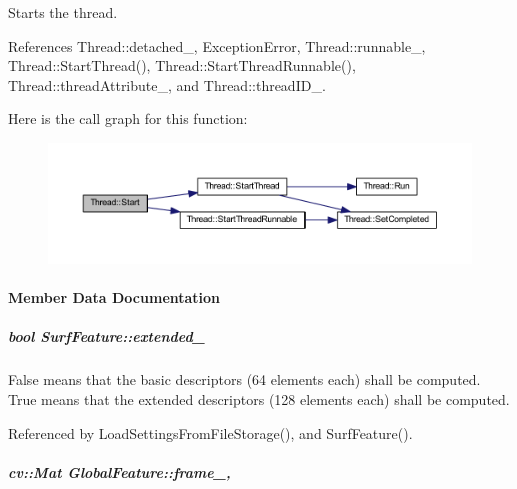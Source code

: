 Starts the thread. 



References Thread\-::detached\-\_\-, Exception\-Error, Thread\-::runnable\-\_\-, Thread\-::\-Start\-Thread(), Thread\-::\-Start\-Thread\-Runnable(), Thread\-::thread\-Attribute\-\_\-, and Thread\-::thread\-I\-D\-\_\-.



Here is the call graph for this function\-:
\nopagebreak
\begin{figure}[H]
\begin{center}
\leavevmode
\includegraphics[width=350pt]{group___core_a2b42f82341afd2747ea093b6ac8b91cb_cgraph}
\end{center}
\end{figure}




\paragraph{Member Data Documentation}
\hypertarget{group___feature_extractor_a89c68527db49e286206062375b09c7bd}{
\subparagraph[{extended\-\_\-}]{\setlength{\rightskip}{0pt plus 5cm}bool Surf\-Feature\-::extended\-\_\-\hspace{0.3cm}{\ttfamily [private]}}}\label{group___feature_extractor_a89c68527db49e286206062375b09c7bd}


False means that the basic descriptors (64 elements each) shall be computed. True means that the extended descriptors (128 elements each) shall be computed. 



Referenced by Load\-Settings\-From\-File\-Storage(), and Surf\-Feature().

\hypertarget{group___feature_extractor_aae4295da2c3999edcb99b46d70ee7166}{
\subparagraph[{frame\-\_\-}]{\setlength{\rightskip}{0pt plus 5cm}cv\-::\-Mat Global\-Feature\-::frame\-\_\-\hspace{0.3cm}{\ttfamily [protected]}, {\ttfamily [inherited]}}}\label{group___feature_extractor_aae4295da2c3999edcb99b46d70ee7166}


